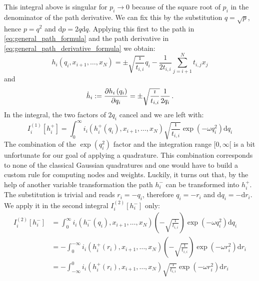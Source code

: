 \documentclass[a4paper,10pt]{article}
\begin{document}
This integral above is singular for $p_i \rightarrow 0$ because of
the square root of $p_i$ in the denominator of the path derivative.
We can fix this by the substitution $q = \sqrt{p}$, hence $p = q^2$
and $\mathrm{d}p = 2 q \mathrm{d}q$. Applying this first to the path
in \eqref{eq:general_path_formula} and the path derivative in
\eqref{eq:general_path_derivative_formula} we obtain:
\begin{equation}
  h_i\left(q_i, x_{i+1}, \ldots, x_N\right)
  =
  \pm \sqrt{\frac{\imath}{t_{i,i}}} q_i
  -\frac{1}{2 t_{i,i}} \sum_{j=i+1}^{N} t_{i,j} x_j
\end{equation}
and
\begin{equation}
  \dot{h}_i := \frac{\partial h_i\left(q_i\right)}{\partial q_i}
  = \pm \sqrt{\frac{\imath}{t_{i,i}}} \frac{1}{2 q_i} \,.
\end{equation}
In the integral, the two factors of $2 q_i$ cancel and we are
left with:
\begin{equation}
  I_i^{(1)}[h_i^{+}] =
  \int_0^\infty
    i_i\left(h_i^{+}\left(q_i\right), x_{i+1},\ldots,x_N\right)
    \sqrt{\frac{\imath}{t_{i,i}}}
    \exp\left(- \omega q_i^2\right)
  \mathrm{d}q_i
\end{equation}
The combination of the $\exp(q_i^2)$ factor and the integration range
$[0, \infty[$ is a bit unfortunate for our goal of applying a quadrature.
This combination corresponds to none of the classical Gaussian quadratures
and one would have to build a custom rule for computing nodes and weights.
Luckily, it turns out that, by the help of another variable transformation
the path $h_i^{-}$ can be transformed into $h_i^{+}$. The substitution
is trivial and reads $r_i = -q_i$, therefore $q_i = -r_i$ and
$\mathrm{d}q_i = -\mathrm{d}r_i$. We apply it in the second integral
$I_i^{(2)}[h_i^{-}]$ only:
\begin{equation}
\begin{split}
  I_i^{(2)}[h_i^{-}] & =
  \int_0^\infty
    i_i\left(h_i^{-}\left(q_i\right), x_{i+1},\ldots,x_N\right)
    \left(-\sqrt{\frac{\imath}{t_{i,i}}}\right)
    \exp\left(- \omega q_i^2\right)
  \mathrm{d}q_i \\
  & =
  - \int_0^{-\infty}
    i_i\left(h_i^{+}\left(r_i\right), x_{i+1},\ldots,x_N\right)
    \left(-\sqrt{\frac{\imath}{t_{i,i}}}\right)
    \exp\left(- \omega r_i^2\right)
  \mathrm{d}r_i \\
  & =
  - \int_{-\infty}^0
    i_i\left(h_i^{+}\left(r_i\right), x_{i+1},\ldots,x_N\right)
    \sqrt{\frac{\imath}{t_{i,i}}}
    \exp\left(- \omega r_i^2\right)
  \mathrm{d}r_i \\
\end{split}
\end{equation}
\end{document}
